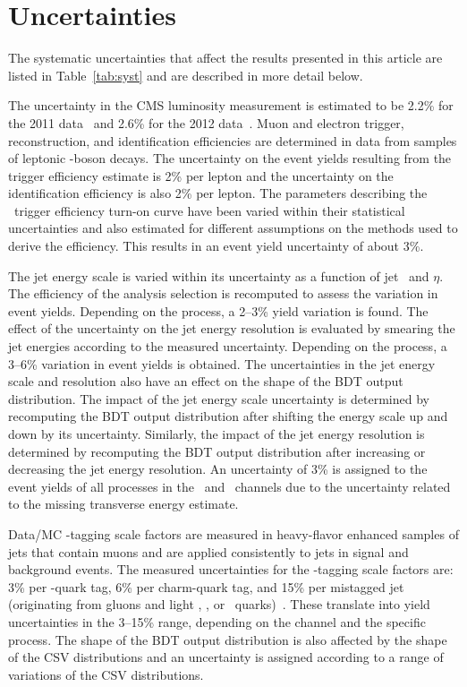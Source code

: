 \documentclass[12pt,twoside,a4paper,cmspaper,final,collab]{cms-tdr}
\begin{document}
\section{Uncertainties}\label{sec:hbb_Uncertainties}

The systematic uncertainties that affect the results presented in this
article are listed in
Table~\ref{tab:syst} and are described in more detail below.

The uncertainty in the CMS luminosity measurement is estimated to be 2.2\%
for the 2011 data~\cite{CMS-PAS-SMP-12-008} and 2.6\% for the 2012 data~\cite{CMS-PAS-LUM-12-001}.
Muon and electron trigger,
reconstruction, and identification efficiencies are
determined in data from samples of
leptonic \cPZ-boson decays. The uncertainty on the event yields resulting
from the trigger efficiency estimate is
2\% per lepton and the uncertainty on the
identification efficiency is also 2\% per lepton. The parameters describing the
\ZnnH\ trigger efficiency turn-on curve have been
varied within their statistical uncertainties and also estimated for different
assumptions on the methods used to derive the efficiency.  This
results in an event yield
uncertainty of about 3\%.

The jet energy scale is
varied within its uncertainty as a function of jet \pt\ and
$\eta$. The efficiency of the analysis selection is
recomputed to assess the variation in event yields.  Depending on the
process, a 2--3\%
yield variation is found. The effect of the uncertainty
on the jet energy resolution is evaluated by
smearing the jet energies according to the measured
uncertainty. Depending on the process, a 3--6\% variation in event yields is
obtained. The uncertainties in the jet energy scale and
resolution also have an effect on the shape of the BDT
output distribution. The impact of the jet energy scale uncertainty is determined by recomputing
the BDT output distribution after shifting the energy scale up and down by its
uncertainty.   Similarly, the impact of the jet energy resolution is
determined by recomputing the BDT output distribution after increasing or decreasing the jet energy resolution. An uncertainty of 3\% is assigned to
the event yields of all processes in the \WlnH\ and \ZnnH\ channels due to the
uncertainty related to the missing transverse energy estimate.


Data/MC \cPqb-tagging scale factors are measured in heavy-flavor
enhanced samples of jets that contain muons and
are applied  consistently to jets in signal and background
events. The measured uncertainties for the \cPqb-tagging scale factors are:
3\% per \cPqb-quark tag, 6\% per charm-quark tag, and 15\% per
mistagged jet (originating from gluons and light \cPqu, \cPqd, or \cPqs\ quarks)~\cite{Chatrchyan:2012jua}. These translate into yield uncertainties in the 3--15\%
range, depending on the channel and the specific process. The
shape of the BDT output distribution is also affected by the shape of
the CSV distributions and an uncertainty is assigned according to a range of variations of the CSV distributions.
\end{document}
